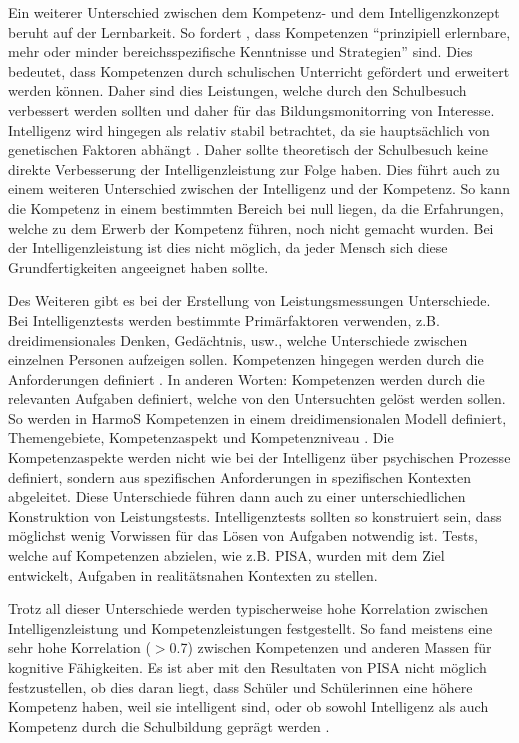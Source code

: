 Ein weiterer Unterschied zwischen dem Kompetenz- und dem Intelligenzkonzept beruht auf der Lernbarkeit. So fordert \citet[S. 22]{Baumert2001}, dass Kompetenzen "`prinzipiell erlernbare, mehr oder minder bereichsspezifische Kenntnisse und Strategien"' sind. Dies bedeutet, dass Kompetenzen durch schulischen Unterricht gefördert und erweitert werden können. Daher sind dies Leistungen, welche durch den Schulbesuch verbessert werden sollten und daher für das Bildungsmonitorring von Interesse. Intelligenz wird hingegen als relativ stabil betrachtet, da sie hauptsächlich von genetischen Faktoren abhängt \citep{Shakeshaft2013}. Daher sollte theoretisch der Schulbesuch keine direkte Verbesserung der Intelligenzleistung zur Folge haben. Dies führt auch zu einem weiteren Unterschied zwischen der Intelligenz und der Kompetenz. So kann die Kompetenz in einem bestimmten Bereich bei null liegen, da die Erfahrungen, welche zu dem Erwerb der Kompetenz führen, noch nicht gemacht wurden. Bei der Intelligenzleistung ist dies nicht möglich, da jeder Mensch sich diese Grundfertigkeiten angeeignet haben sollte.


Des Weiteren gibt es bei der Erstellung von Leistungsmessungen Unterschiede. Bei Intelligenztests werden bestimmte Primärfaktoren verwenden, z.B. dreidimensionales Denken, Gedächtnis, usw., welche Unterschiede zwischen einzelnen Personen aufzeigen sollen. Kompetenzen hingegen werden durch die Anforderungen definiert \citep{Rychen}. In anderen Worten: Kompetenzen werden durch die relevanten Aufgaben definiert, welche von den Untersuchten gelöst werden sollen. So werden in HarmoS Kompetenzen in einem dreidimensionalen Modell definiert, Themengebiete, Kompetenzaspekt und Kompetenzniveau \citep{KonsotriumHarmoSNaturwissenschaften+2010}. Die Kompetenzaspekte werden nicht wie bei der Intelligenz über psychischen Prozesse definiert, sondern aus spezifischen Anforderungen in spezifischen Kontexten abgeleitet. Diese Unterschiede führen dann auch zu einer unterschiedlichen Konstruktion von Leistungstests. Intelligenztests sollten so konstruiert sein, dass möglichst wenig Vorwissen für das Lösen von Aufgaben notwendig ist. Tests, welche auf Kompetenzen abzielen, wie z.B. PISA, wurden mit dem Ziel entwickelt, Aufgaben in realitätsnahen  Kontexten zu stellen. 

Trotz all dieser Unterschiede werden typischerweise hohe Korrelation zwischen Intelligenzleistung und Kompetenzleistungen festgestellt. So fand \citet{Rindermann2006} meistens eine sehr hohe Korrelation ($ > $0.7) zwischen Kompetenzen und anderen Massen für kognitive Fähigkeiten. Es ist aber mit den Resultaten von PISA nicht möglich festzustellen, ob dies daran liegt, dass Schüler und Schülerinnen eine höhere Kompetenz haben, weil sie intelligent sind, oder ob sowohl Intelligenz als auch Kompetenz durch die Schulbildung geprägt werden \citep{Hartig2006}.



